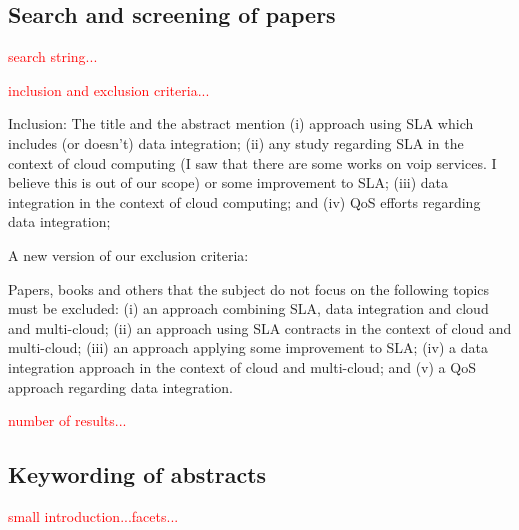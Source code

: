 \subsection{Search and screening of papers}
\textcolor{red}{search string...}

\textcolor{red}{inclusion and exclusion criteria...}

Inclusion: The title and the abstract mention (i) approach using SLA which includes (or doesn't) data integration; (ii) any study regarding SLA in the context of cloud computing (I saw that there are some works on voip services. I believe this is out of our scope) or some improvement to SLA; (iii) data integration in the context of cloud computing; and (iv) QoS efforts regarding data integration;

A new version of our exclusion criteria:

Papers, books and others that the subject do not focus on the following topics must be excluded:
(i) an approach combining SLA, data integration and cloud and multi-cloud;
(ii) an approach using SLA contracts in the context of cloud and multi-cloud;
(iii) an approach applying some improvement to SLA;
(iv) a data integration approach in the context of cloud and multi-cloud; and
(v) a QoS approach regarding data integration.

\textcolor{red}{number  of results...}

\subsection{Keywording of abstracts}

\textcolor{red}{small introduction...facets...}


